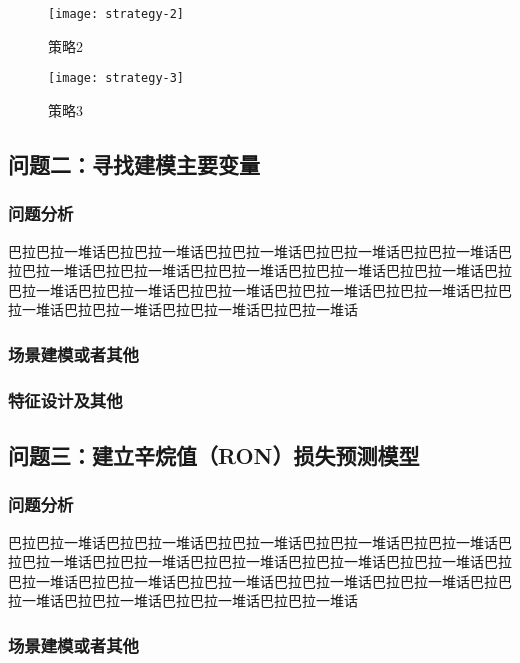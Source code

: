 \documentclass[bwprint]{gmcmthesis}
\begin{document}
\begin{figure}[htbp]
	\centering
	\texttt{[image: strategy-2]}
	\caption{策略2}
\end{figure}


\begin{figure}[htbp]
	\centering
	\texttt{[image: strategy-3]}
	\caption{策略3}
\end{figure}

\subsection{问题二：寻找建模主要变量}
\subsubsection{问题分析}

巴拉巴拉一堆话巴拉巴拉一堆话巴拉巴拉一堆话巴拉巴拉一堆话巴拉巴拉一堆话巴拉巴拉一堆话巴拉巴拉一堆话巴拉巴拉一堆话巴拉巴拉一堆话巴拉巴拉一堆话巴拉巴拉一堆话巴拉巴拉一堆话巴拉巴拉一堆话巴拉巴拉一堆话巴拉巴拉一堆话巴拉巴拉一堆话巴拉巴拉一堆话巴拉巴拉一堆话巴拉巴拉一堆话
\subsubsection{场景建模或者其他}

\subsubsection{特征设计及其他}


\subsection{问题三：建立辛烷值（RON）损失预测模型}
\subsubsection{问题分析}

巴拉巴拉一堆话巴拉巴拉一堆话巴拉巴拉一堆话巴拉巴拉一堆话巴拉巴拉一堆话巴拉巴拉一堆话巴拉巴拉一堆话巴拉巴拉一堆话巴拉巴拉一堆话巴拉巴拉一堆话巴拉巴拉一堆话巴拉巴拉一堆话巴拉巴拉一堆话巴拉巴拉一堆话巴拉巴拉一堆话巴拉巴拉一堆话巴拉巴拉一堆话巴拉巴拉一堆话巴拉巴拉一堆话

\subsubsection{场景建模或者其他}
\end{document}
